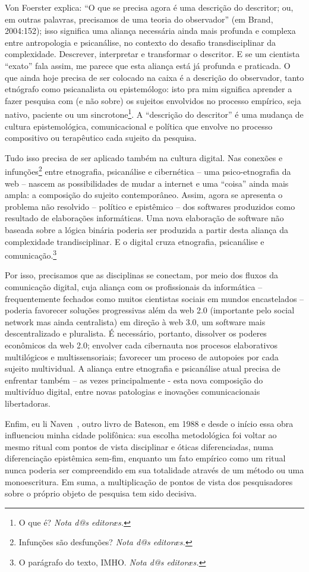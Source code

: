 \documentclass[a4paper, 11pt]{article} %
\makeatletter
\newcommand{\ftnt}[1]{\footnote{#1 \emph{Nota d@s editoræs.}}}
\makeatother
\begin{document}
Von Foerster explica: “O que se precisa agora é uma descrição do descritor; ou, em outras palavras, precisamos de uma teoria do observador” (em Brand, 2004:152); isso significa uma aliança necessária ainda mais profunda e complexa entre antropologia e psicanálise, no contexto do desafio  transdisciplinar da complexidade. Descrever, interpretar e transformar o descritor. E se um cientista “exato” fala assim, me parece que esta aliança está já profunda e praticada. O que ainda hoje precisa de ser colocado na caixa é a descrição do observador, tanto etnógrafo como psicanalista ou epistemólogo: isto pra mim significa aprender a fazer pesquisa com (e não sobre) os sujeitos envolvidos no processo empírico, seja nativo, paciente ou um sincrotone\ftnt{O que é?}. A “descrição do descritor” é uma mudança de cultura epistemológica, comunicacional e política que envolve no processo compositivo ou terapêutico cada sujeito da pesquisa. 

Tudo isso precisa de ser aplicado também na cultura digital.  Nas conexões  e infunções\ftnt{Infunções são desfunções?} entre etnografia, psicanálise e cibernética – uma psico-etnografia da web – nascem as possibilidades de mudar a internet e uma “coisa” ainda mais ampla: a composição do sujeito contemporâneo. Assim, agora se apresenta o problema não resolvido – político e epistêmico – dos softwares produzidos como resultado de elaborações informáticas. Uma nova elaboração de software não baseada sobre a lógica binária poderia ser produzida a partir desta aliança da complexidade trandisciplinar. E o digital cruza etnografia, psicanálise e comunicação.\ftnt{O parágrafo do texto, IMHO.}

Por isso, precisamos que as disciplinas se conectam, por meio dos fluxos da comunicação digital, cuja aliança com os profissionais da informática – frequentemente fechados como muitos cientistas sociais em mundos encastelados – poderia favorecer soluções progressivas além da web 2.0 (importante pelo social network mas ainda centralista) em direção à web 3.0, um software  mais descentralizado e pluralista. É necessário, portanto, dissolver os poderes econômicos da web 2.0; envolver cada cibernauta nos procesos elaborativos multilógicos e multissensoriais; favorecer um proceso de autopoies por cada sujeito multividual. A aliança entre etnografia e psicanálise atual precisa de enfrentar também – as vezes principalmente  - esta nova composição do multivíduo digital, entre novas patologias e inovações comunicacionais libertadoras.

Enfim, eu li Naven~\cite{b7}, outro livro de Bateson, em 1988 e desde o início essa obra influenciou minha cidade polifônica: sua escolha metodológica foi voltar ao mesmo ritual com pontos de vista disciplinar e óticas diferenciadas, numa diferenciação epistêmica sem-fim, enquanto um fato empírico como um ritual nunca poderia ser compreendido em sua totalidade através de um método ou uma monoescritura. Em suma, a multiplicação de pontos de vista dos pesquisadores sobre o próprio objeto de pesquisa tem sido decisiva. 
\end{document}
